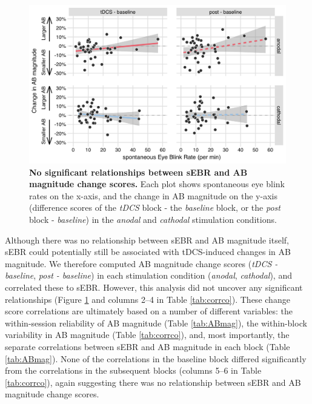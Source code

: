 \documentclass[11pt,]{memoir}
\begin{document}
\begin{figure}
\includegraphics[width=130mm]{AB_sEBR_files/figures/figure_6_tDCS-corr} \caption{\textbf{No significant relationships between sEBR and AB magnitude change scores.} Each plot shows spontaneous eye blink rates on the x-axis, and the change in AB magnitude on the y-axis (difference scores of the \emph{tDCS} block - the \emph{baseline} block, or the \emph{post} block - \emph{baseline}) in the \emph{anodal} and \emph{cathodal} stimulation conditions.}\label{fig:fig-tDCS-corr}
\end{figure}



Although there was no relationship between sEBR and AB magnitude itself, sEBR could potentially still be associated with tDCS-induced changes in AB magnitude. We therefore computed AB magnitude change scores (\emph{tDCS - baseline}, \emph{post - baseline}) in each stimulation condition (\emph{anodal}, \emph{cathodal}), and correlated these to sEBR. However, this analysis did not uncover any significant relationships (Figure \ref{fig:fig-tDCS-corr} and columns 2--4 in Table \ref{tab:corrco}). These change score correlations are ultimately based on a number of different variables: the within-session reliability of AB magnitude (Table \ref{tab:ABmag}), the within-block variability in AB magnitude (Table \ref{tab:corrco}), and, most importantly, the separate correlations between sEBR and AB magnitude in each block (Table \ref{tab:ABmag}). None of the correlations in the baseline block differed significantly from the correlations in the subsequent blocks (columns 5--6 in Table \ref{tab:corrco}), again suggesting there was no relationship between sEBR and AB magnitude change scores.
\end{document}
